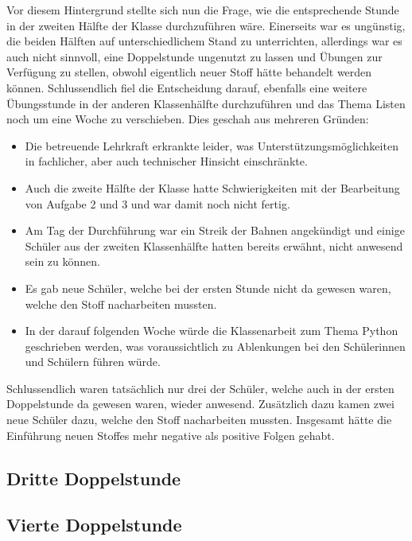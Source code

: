 Vor diesem Hintergrund stellte sich nun die Frage, wie die entsprechende Stunde in der zweiten Hälfte der Klasse durchzuführen wäre.
Einerseits war es ungünstig, die beiden Hälften auf unterschiedlichem Stand zu unterrichten, allerdings war es auch nicht sinnvoll, eine Doppelstunde ungenutzt zu lassen und Übungen zur Verfügung zu stellen, obwohl eigentlich neuer Stoff hätte behandelt werden können.
Schlussendlich fiel die Entscheidung darauf, ebenfalls eine weitere Übungsstunde in der anderen Klassenhälfte durchzuführen und das Thema Listen noch um eine Woche zu verschieben.
Dies geschah aus mehreren Gründen:
\begin{itemize}
	\item Die betreuende Lehrkraft erkrankte leider, was Unterstützungsmöglichkeiten in fachlicher, aber auch technischer Hinsicht einschränkte.
	\item Auch die zweite Hälfte der Klasse hatte Schwierigkeiten mit der Bearbeitung von Aufgabe 2 und 3 und war damit noch nicht fertig.
	\item Am Tag der Durchführung war ein Streik der Bahnen angekündigt und einige Schüler aus der zweiten Klassenhälfte hatten bereits erwähnt, nicht anwesend sein zu können.
	\item Es gab neue Schüler, welche bei der ersten Stunde nicht da gewesen waren, welche den Stoff nacharbeiten mussten.
	\item In der darauf folgenden Woche würde die Klassenarbeit zum Thema Python geschrieben werden, was voraussichtlich zu Ablenkungen bei den Schülerinnen und Schülern führen würde.
\end{itemize}
Schlussendlich waren tatsächlich nur drei der Schüler, welche auch in der ersten Doppelstunde da gewesen waren, wieder anwesend.
Zusätzlich dazu kamen zwei neue Schüler dazu, welche den Stoff nacharbeiten mussten.
Insgesamt hätte die Einführung neuen Stoffes mehr negative als positive Folgen gehabt.


\subsection{Dritte Doppelstunde}
\label{subsec:doppelstunde-3}

\subsection{Vierte Doppelstunde}
\label{subsec:doppelstunde-4}